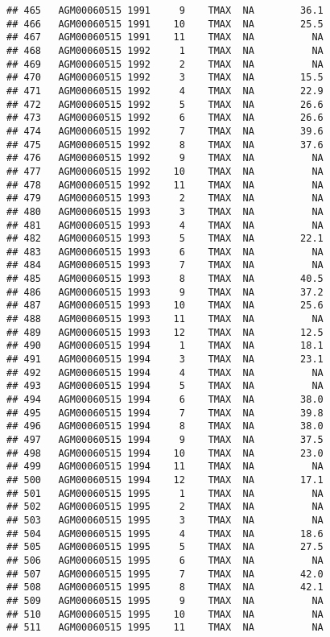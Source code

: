 \documentclass{article}\usepackage[]{graphicx}\usepackage[]{color}
\makeatletter
\newenvironment{kframe}{%
 \def\at@end@of@kframe{}%
 \ifinner\ifhmode%
  \def\at@end@of@kframe{\end{minipage}}%
  \begin{minipage}{\columnwidth}%
 \fi\fi%
 \def\FrameCommand##1{\hskip\@totalleftmargin \hskip-\fboxsep
 \colorbox{shadecolor}{##1}\hskip-\fboxsep
     \hskip-\linewidth \hskip-\@totalleftmargin \hskip\columnwidth}%
 \MakeFramed {\advance\hsize-\width
   \@totalleftmargin\z@ \linewidth\hsize
   \@setminipage}}%
 {\par\unskip\endMakeFramed%
 \at@end@of@kframe}
\newenvironment{knitrout}{}{} %
\makeatother
\begin{document}
\begin{knitrout}
\begin{kframe}
\begin{verbatim}
## 465   AGM00060515 1991     9    TMAX  NA        36.1
## 466   AGM00060515 1991    10    TMAX  NA        25.5
## 467   AGM00060515 1991    11    TMAX  NA          NA
## 468   AGM00060515 1992     1    TMAX  NA          NA
## 469   AGM00060515 1992     2    TMAX  NA          NA
## 470   AGM00060515 1992     3    TMAX  NA        15.5
## 471   AGM00060515 1992     4    TMAX  NA        22.9
## 472   AGM00060515 1992     5    TMAX  NA        26.6
## 473   AGM00060515 1992     6    TMAX  NA        26.6
## 474   AGM00060515 1992     7    TMAX  NA        39.6
## 475   AGM00060515 1992     8    TMAX  NA        37.6
## 476   AGM00060515 1992     9    TMAX  NA          NA
## 477   AGM00060515 1992    10    TMAX  NA          NA
## 478   AGM00060515 1992    11    TMAX  NA          NA
## 479   AGM00060515 1993     2    TMAX  NA          NA
## 480   AGM00060515 1993     3    TMAX  NA          NA
## 481   AGM00060515 1993     4    TMAX  NA          NA
## 482   AGM00060515 1993     5    TMAX  NA        22.1
## 483   AGM00060515 1993     6    TMAX  NA          NA
## 484   AGM00060515 1993     7    TMAX  NA          NA
## 485   AGM00060515 1993     8    TMAX  NA        40.5
## 486   AGM00060515 1993     9    TMAX  NA        37.2
## 487   AGM00060515 1993    10    TMAX  NA        25.6
## 488   AGM00060515 1993    11    TMAX  NA          NA
## 489   AGM00060515 1993    12    TMAX  NA        12.5
## 490   AGM00060515 1994     1    TMAX  NA        18.1
## 491   AGM00060515 1994     3    TMAX  NA        23.1
## 492   AGM00060515 1994     4    TMAX  NA          NA
## 493   AGM00060515 1994     5    TMAX  NA          NA
## 494   AGM00060515 1994     6    TMAX  NA        38.0
## 495   AGM00060515 1994     7    TMAX  NA        39.8
## 496   AGM00060515 1994     8    TMAX  NA        38.0
## 497   AGM00060515 1994     9    TMAX  NA        37.5
## 498   AGM00060515 1994    10    TMAX  NA        23.0
## 499   AGM00060515 1994    11    TMAX  NA          NA
## 500   AGM00060515 1994    12    TMAX  NA        17.1
## 501   AGM00060515 1995     1    TMAX  NA          NA
## 502   AGM00060515 1995     2    TMAX  NA          NA
## 503   AGM00060515 1995     3    TMAX  NA          NA
## 504   AGM00060515 1995     4    TMAX  NA        18.6
## 505   AGM00060515 1995     5    TMAX  NA        27.5
## 506   AGM00060515 1995     6    TMAX  NA          NA
## 507   AGM00060515 1995     7    TMAX  NA        42.0
## 508   AGM00060515 1995     8    TMAX  NA        42.1
## 509   AGM00060515 1995     9    TMAX  NA          NA
## 510   AGM00060515 1995    10    TMAX  NA          NA
## 511   AGM00060515 1995    11    TMAX  NA          NA

\end{verbatim}
\end{kframe}
\end{knitrout}
\end{document}
